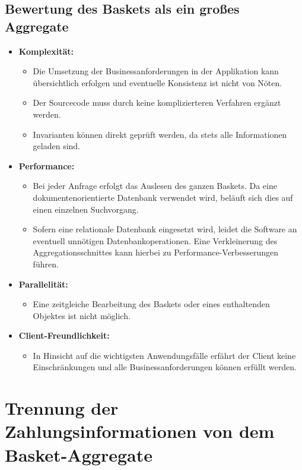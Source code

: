 \subsection{Bewertung des Baskets als ein großes Aggregate}

\begin{itemize}[noitemsep,nolistsep,topsep=-2pt]
	\item \textbf{Komplexität: } {
		\begin{itemize}
			\item {Die Umsetzung der Businessanforderungen in der Applikation kann übersichtlich erfolgen und eventuelle Konsistenz ist nicht von Nöten. }
			\item {Der Sourcecode muss durch keine komplizierteren Verfahren ergänzt werden.}
			\item {Invarianten können direkt geprüft werden, da stets alle Informationen geladen sind. }
		\end{itemize}
	}
	\item \textbf{Performance: } {
		\begin{itemize}
			\item Bei jeder Anfrage erfolgt das Auslesen des ganzen Baskets. Da eine dokumentenorientierte Datenbank verwendet wird, beläuft sich dies auf einen einzelnen Suchvorgang.
			\item Sofern eine relationale Datenbank eingesetzt wird, leidet die Software an eventuell unnötigen Datenbankoperationen. Eine Verkleinerung des Aggregationsschnittes kann hierbei zu Performance-Verbesserungen führen.
		\end{itemize}
	}
	\item \textbf{Parallelität: } {
		\begin{itemize}
			\item Eine zeitgleiche Bearbeitung des Baskets oder eines enthaltenden Objektes ist nicht möglich.
		\end{itemize}	
	}
	\item \textbf{Client-Freundlichkeit: } {
		\begin{itemize}
			\item In Hinsicht auf die wichtigsten Anwendungsfälle erfährt der Client keine Einschränkungen und alle Businessanforderungen können erfüllt werden.
		\end{itemize}
	}
\end{itemize}


\section{Trennung der Zahlungsinformationen von dem Basket-Aggregate}


